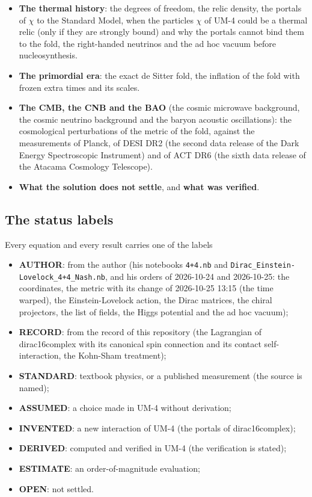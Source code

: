 \documentclass[
  10pt,
]{article}
\providecommand{\tightlist}{%
  \setlength{\itemsep}{0pt}\setlength{\parskip}{0pt}}
\begin{document}
\begin{itemize}
  change.
\item
  \textbf{The thermal history}: the degrees of freedom, the relic
  density, the portals of \(\chi\) to the Standard Model, when the
  particles \(\chi\) of UM-4 could be a thermal relic (only if they are
  strongly bound) and why the portals cannot bind them to the fold, the
  right-handed neutrinos and the ad hoc vacuum before nucleosynthesis.
\item
  \textbf{The primordial era}: the exact de Sitter fold, the inflation
  of the fold with frozen extra times and its scales.
\item
  \textbf{The CMB, the CNB and the BAO} (the cosmic microwave
  background, the cosmic neutrino background and the baryon acoustic
  oscillations): the cosmological perturbations of the metric of the
  fold, against the measurements of Planck, of DESI DR2 (the second data
  release of the Dark Energy Spectroscopic Instrument) and of ACT DR6
  (the sixth data release of the Atacama Cosmology Telescope).
\item
  \textbf{What the solution does not settle}, and \textbf{what was
  verified}.
\end{itemize}

\hypertarget{the-status-labels}{%
\subsection{The status labels}\label{the-status-labels}}

Every equation and every result carries one of the labels

\begin{itemize}
\tightlist
\item
  \textbf{AUTHOR}: from the author (his notebooks \texttt{4+4.nb} and
  \texttt{Dirac\_Einstein-Lovelock\_4+4\_Nash.nb}, and his orders of
  2026-10-24 and 2026-10-25: the coordinates, the metric with its change
  of 2026-10-25 13:15 (the time warped), the Einstein-Lovelock action,
  the Dirac matrices, the chiral projectors, the list of fields, the
  Higgs potential and the ad hoc vacuum);
\item
  \textbf{RECORD}: from the record of this repository (the Lagrangian of
  dirac16complex with its canonical spin connection and its contact
  self-interaction, the Kohn-Sham treatment);
\item
  \textbf{STANDARD}: textbook physics, or a published measurement (the
  source is named);
\item
  \textbf{ASSUMED}: a choice made in UM-4 without derivation;
\item
  \textbf{INVENTED}: a new interaction of UM-4 (the portals of
  dirac16complex);
\item
  \textbf{DERIVED}: computed and verified in UM-4 (the verification is
  stated);
\item
  \textbf{ESTIMATE}: an order-of-magnitude evaluation;
\item
  \textbf{OPEN}: not settled.
\end{itemize}
\end{document}
